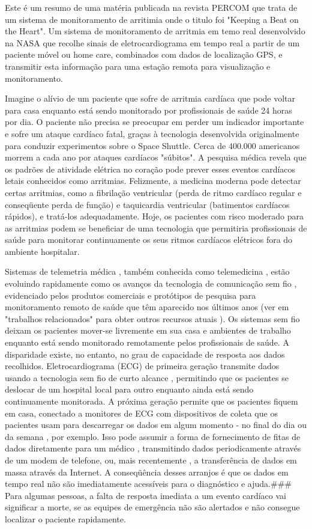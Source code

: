 \documentclass[12pt]{article} %
\begin{document}
Este é um resumo de uma matéria publicada na revista PERCOM que trata de um sistema de monitoramento de arritimia onde o titulo foi "Keeping a Beat on the Heart".
Um sistema de monitoramento de arritmia em temo real desenvolvido na NASA que 
recolhe sinais de eletrocardiograma em tempo real a partir de um paciente móvel ou home care, combinados com dados de localização GPS, e transmitir esta informação para uma estação remota para visualização e monitoramento.

Imagine o alívio de um paciente que sofre de arritmia cardíaca que pode voltar para casa enquanto está sendo monitorado por profissionais de saúde 24 horas por dia. O paciente não precisa se ​​preocupar em perder um indicador importante e sofre um ataque cardíaco fatal, graças à tecnologia desenvolvida originalmente para conduzir experimentos sobre o Space Shuttle. Cerca de 400.000 americanos morrem a cada ano por ataques cardíacos "súbitos". A pesquisa médica revela que os padrões de atividade elétrica no coração pode prever esses eventos cardíacos letais conhecidos como arritmias. Felizmente, a medicina moderna pode detectar certas arritmias, como a fibrilação ventricular (perda de ritmo cardíaco regular e conseqüente perda de função) e taquicardia ventricular (batimentos cardíacos rápidos), e tratá-los adequadamente. Hoje, os pacientes com risco moderado para as arritmias podem se beneficiar de uma tecnologia que permitiria profissionais de saúde para monitorar continuamente os seus ritmos cardíacos elétricos fora do ambiente hospitalar.

Sistemas de telemetria médica , também conhecida como telemedicina , estão evoluindo rapidamente como os avanços da tecnologia de comunicação sem fio , evidenciado pelos produtos comerciais e protótipos de pesquisa para monitoramento remoto de saúde que têm aparecido nos últimos anos (ver em "trabalhos relacionados" para obter outros recursos atuais ). Os sistemas sem fio deixam os pacientes mover-se livremente em sua casa e ambientes de trabalho enquanto está sendo monitorado remotamente pelos profissionais de saúde. A disparidade existe, no entanto, no grau de capacidade de resposta aos dados recolhidos. Eletrocardiograma (ECG) de primeira geração transmite dados usando a tecnologia sem fio de curto alcance , permitindo que os pacientes se deslocar de um hospital local para outro enquanto ainda está sendo continuamente monitorada. A próxima geração permite que os pacientes fiquem em casa, conectado a monitores de ECG com dispositivos de coleta que os pacientes usam para descarregar os dados em algum momento - no final do dia ou da semana , por exemplo. Isso pode assumir a forma de fornecimento de fitas de dados diretamente para um médico , transmitindo dados periodicamente através de um modem de telefone, ou, mais recentemente , a transferência de dados em massa através da Internet. A conseqüência desses arranjos é que os dados em tempo real não são imediatamente acessíveis para o diagnóstico e ajuda.### Para algumas pessoas, a falta de resposta imediata a um evento cardíaco vai significar a morte, se as equipes de emergência não são alertados e não consegue localizar o paciente rapidamente.
\end{document}

